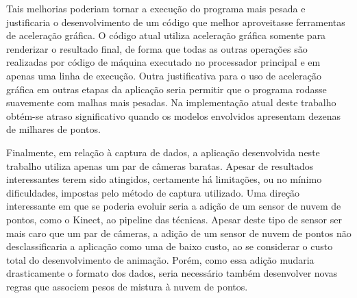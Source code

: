 Tais melhorias poderiam tornar a execução do programa mais pesada e justificaria
o desenvolvimento de um código que melhor aproveitasse ferramentas de aceleração
gráfica. O código atual utiliza aceleração gráfica somente para renderizar o
resultado final, de forma que todas as outras operações são realizadas por
código  de máquina executado no processador principal  e em apenas uma linha de
execução. Outra justificativa para o uso de aceleração gráfica em outras etapas
da aplicação seria permitir que o programa rodasse suavemente com malhas mais
pesadas. Na implementação atual deste trabalho obtém-se atraso significativo
quando os modelos envolvidos apresentam dezenas de milhares de pontos.

Finalmente, em relação à captura de dados, a aplicação desenvolvida neste
trabalho utiliza apenas um par de câmeras baratas. Apesar de resultados
interessantes terem sido atingidos, certamente há limitações, ou no mínimo
dificuldades, impostas pelo método de captura utilizado.  Uma direção
interessante em que se poderia evoluir seria a adição de um sensor de nuvem de
pontos, como o Kinect, ao pipeline das técnicas. Apesar deste tipo de sensor ser
mais caro que um par de câmeras, a adição de um sensor de nuvem de pontos não
desclassificaria a aplicação como uma de baixo custo, ao se considerar o custo
total do desenvolvimento de animação. Porém, como essa adição mudaria
drasticamente o formato dos dados, seria necessário também desenvolver novas
regras que associem pesos de mistura à nuvem de pontos.

